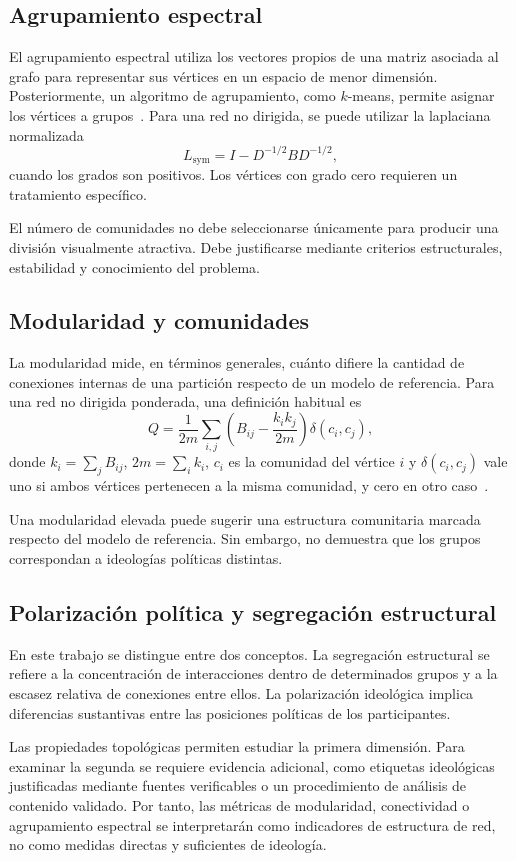 \documentclass[journal]{IEEEtran}
\begin{document}
\subsection{Agrupamiento espectral}
El agrupamiento espectral utiliza los vectores propios de una matriz asociada al grafo para representar sus vértices en un espacio de menor dimensión. Posteriormente, un algoritmo de agrupamiento, como $k$-means, permite asignar los vértices a grupos~\cite{luxburg}. Para una red no dirigida, se puede utilizar la laplaciana normalizada
\[
L_{\mathrm{sym}}=I-D^{-1/2}BD^{-1/2},
\]
cuando los grados son positivos. Los vértices con grado cero requieren un tratamiento específico.

El número de comunidades no debe seleccionarse únicamente para producir una división visualmente atractiva. Debe justificarse mediante criterios estructurales, estabilidad y conocimiento del problema.

\subsection{Modularidad y comunidades}
La modularidad mide, en términos generales, cuánto difiere la cantidad de conexiones internas de una partición respecto de un modelo de referencia. Para una red no dirigida ponderada, una definición habitual es
\[
Q=\frac{1}{2m}\sum_{i,j}\left(B_{ij}-\frac{k_i k_j}{2m}\right)\delta(c_i,c_j),
\]
donde $k_i=\sum_j B_{ij}$, $2m=\sum_i k_i$, $c_i$ es la comunidad del vértice $i$ y $\delta(c_i,c_j)$ vale uno si ambos vértices pertenecen a la misma comunidad, y cero en otro caso~\cite{newman}.

Una modularidad elevada puede sugerir una estructura comunitaria marcada respecto del modelo de referencia. Sin embargo, no demuestra que los grupos correspondan a ideologías políticas distintas.

\subsection{Polarización política y segregación estructural}
En este trabajo se distingue entre dos conceptos. La segregación estructural se refiere a la concentración de interacciones dentro de determinados grupos y a la escasez relativa de conexiones entre ellos. La polarización ideológica implica diferencias sustantivas entre las posiciones políticas de los participantes.

Las propiedades topológicas permiten estudiar la primera dimensión. Para examinar la segunda se requiere evidencia adicional, como etiquetas ideológicas justificadas mediante fuentes verificables o un procedimiento de análisis de contenido validado. Por tanto, las métricas de modularidad, conectividad o agrupamiento espectral se interpretarán como indicadores de estructura de red, no como medidas directas y suficientes de ideología.
\end{document}

